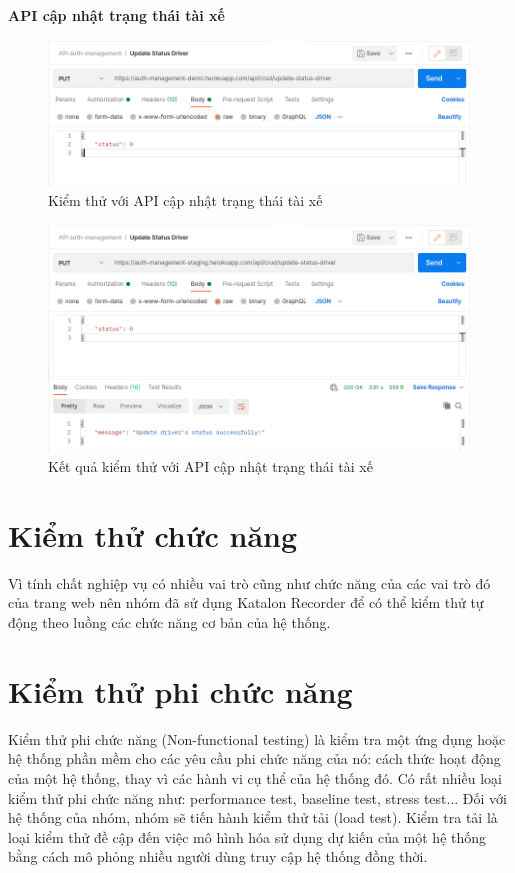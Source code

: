 		\newpage
		\textbf{API cập nhật trạng thái tài xế}
		
		\begin{figure}[H]
			\includegraphics[width=1\textwidth]{Images/testing/API-update-status-driver.png}
			\centering
			\linebreak
			\caption{Kiểm thử với API cập nhật trạng thái tài xế}
		\end{figure}
		
		\begin{figure}[H]
			\includegraphics[width=1\textwidth]{Images/testing/API-update-status-driver-result.png}
			\centering
			\linebreak
			\caption{Kết quả kiểm thử với API cập nhật trạng thái tài xế}
		\end{figure}
		
		\section{Kiểm thử chức năng}
		    Vì tính chất nghiệp vụ có nhiều vai trò cũng như chức năng của các vai trò đó của trang web nên nhóm đã sử dụng Katalon Recorder để có thể kiểm thử tự động theo luồng các chức năng cơ bản của hệ thống.
			
		\section{Kiểm thử phi chức năng}
		    Kiểm thử phi chức năng (Non-functional testing) là kiểm tra một ứng dụng hoặc hệ thống phần mềm cho các yêu cầu phi chức năng của nó: cách thức hoạt động của một hệ thống, thay vì các hành vi cụ thể của hệ thống đó. Có rất nhiều loại kiểm thử phi chức năng như: performance test, baseline test, stress test... Đối với hệ thống của nhóm, nhóm sẽ tiến hành kiểm thử tải (load test). Kiểm tra tải là loại kiểm thử đề cập đến việc mô hình hóa sử dụng dự kiến của một hệ thống bằng cách mô phỏng nhiều người dùng truy cập hệ thống đồng thời.\\
		    
